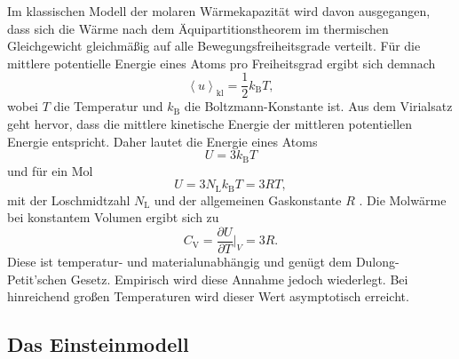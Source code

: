 Im klassischen Modell der molaren Wärmekapazität wird davon ausgegangen, dass sich die Wärme nach dem Äquipartitionstheorem im thermischen Gleichgewicht gleichmäßig auf alle Bewegungsfreiheitsgrade verteilt.
Für die mittlere potentielle Energie eines Atoms pro Freiheitsgrad ergibt sich demnach
\begin{equation}
  \left\langle u \right\rangle_{\text{kl}} = \frac{1}{2}k_{\text{B}}T,
\end{equation}
wobei $T$ die Temperatur und $k_{\text{B}}$ die Boltzmann-Konstante \cite{scipy} ist.
Aus dem Virialsatz geht hervor, dass die mittlere kinetische Energie der mittleren potentiellen Energie entspricht.
Daher lautet die Energie eines Atoms
\begin{equation}
  U = 3k_{\text{B}}T
\end{equation}
und für ein Mol
\begin{equation}
  U = 3N_{\text{L}}k_{\text{B}}T = 3RT,
\end{equation}
mit der Loschmidtzahl $N_{\text{L}}$ und der allgemeinen Gaskonstante $R$ \cite{scipy}.
Die Molwärme bei konstantem Volumen ergibt sich zu
\begin{equation}
  C_{\text{V}} = \frac{\partial U}{\partial T}\biggr|_V = 3R.
\end{equation}
Diese ist temperatur- und materialunabhängig und genügt dem Dulong-Petit'schen Gesetz.
Empirisch wird diese Annahme jedoch wiederlegt.
Bei hinreichend großen Temperaturen wird dieser Wert asymptotisch erreicht.

\subsection{Das Einsteinmodell}

